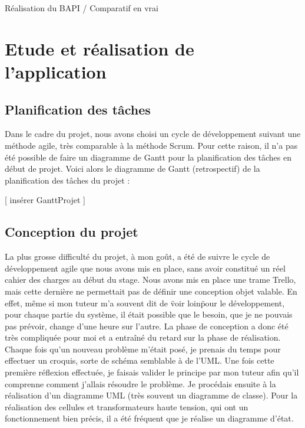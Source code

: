 \documentclass[a4paper]{article}
\begin{document}
    Réalisation du BAPI / Comparatif en vrai \\

    \section{Etude et réalisation de l'application}

    \subsection{Planification des tâches}
    
     Dans le cadre du projet, nous avons choisi un cycle de développement suivant une méthode agile, très comparable à la méthode Scrum. Pour cette raison, il n'a pas été possible de faire un diagramme de Gantt pour la planification des tâches en début de projet. Voici alors le diagramme de Gantt (retrospectif) de la planification des tâches du projet :

     [ insérer GanttProjet ]   

    \subsection{Conception du projet}

    La plus grosse difficulté du projet, à mon goût, a été de suivre le cycle de développement agile que nous avons mis en place, sans avoir constitué un réel cahier des charges au début du stage. Nous avons mis en place une trame Trello, mais cette dernière ne permettait pas de définir une conception objet valable. En effet, même si mon tuteur m'a souvent dit de \"voir loin\" pour le développement, pour chaque partie du système, il était possible que le besoin, que je ne pouvais pas prévoir, change d'une heure sur l'autre. La phase de conception a donc été très compliquée pour moi et a entraîné du retard sur la phase de réalisation. \\
    
    Chaque fois qu'un nouveau problème m'était posé, je prenais du temps pour effectuer un croquis, sorte de schéma semblable à de l'UML. Une fois cette première réflexion effectuée, je faisais valider le principe par mon tuteur afin qu'il comprenne comment j'allais résoudre le problème. Je procédais ensuite à la réalisation d'un diagramme UML (très souvent un diagramme de classe). Pour la réalisation des cellules et transformateurs haute tension, qui ont un fonctionnement bien précis, il a été fréquent que je réalise un diagramme d'état. \\ 
\end{document}
